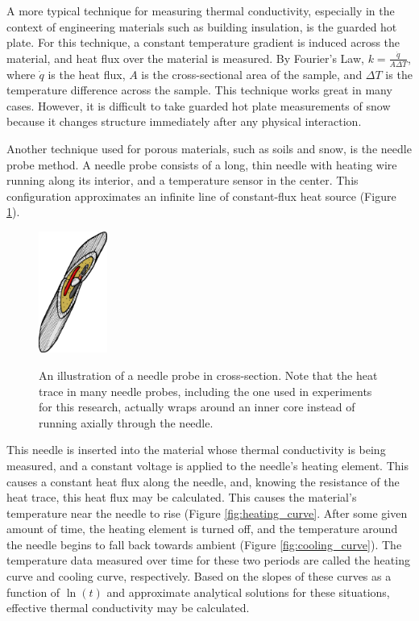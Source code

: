 A more typical technique for measuring thermal conductivity, especially in the
context of engineering materials such as building insulation, is the guarded
hot plate. For this technique, a constant temperature gradient is induced across
the material, and heat flux over the material is measured.  By Fourier's Law,
\(k = \frac{\dot{q}}{A\Delta T}\), where \(\dot{q}\) is the heat flux, \(A\) is
the cross-sectional area of the sample, and \(\Delta T\) is the temperature
difference across the sample. This technique works great in many cases. However, it is difficult to take
guarded hot plate measurements of snow because it changes structure immediately
after any physical interaction.

Another technique used for porous materials, such as soils and snow, is the
needle probe method. A needle probe consists of a long, thin needle with heating
wire running along its interior, and a temperature sensor in the center. This
configuration approximates an infinite line of constant-flux heat source
(Figure \ref{fig:needle_xsect}).

\begin{figure}[h]
\centering
\includegraphics[width=0.2\textwidth]{fig/needle_xsect.png}
\label{fig:needle_xsect}
\caption{An illustration of a needle probe in cross-section. Note that the heat
trace in many needle probes, including the one used in experiments for this
research, actually wraps around an inner core instead of running axially through
the needle.}
\end{figure}

This needle is inserted into the material whose thermal conductivity is being
measured, and a constant voltage is applied to the needle's heating element.
This causes a constant heat flux along the needle, and, knowing the resistance
of the heat trace, this heat flux may be calculated. This causes the material's
temperature near the needle to rise (Figure \ref{fig:heating_curve}. After some
given amount of time, the heating element is turned off, and the temperature
around the needle begins to fall back towards ambient (Figure \ref{fig:cooling_curve}).
The temperature data measured over time for these two periods are called the
heating curve and cooling curve, respectively.  Based on the slopes of these
curves as a function of \(\ln(t)\) and approximate analytical solutions for
these situations, effective thermal conductivity may be calculated.

